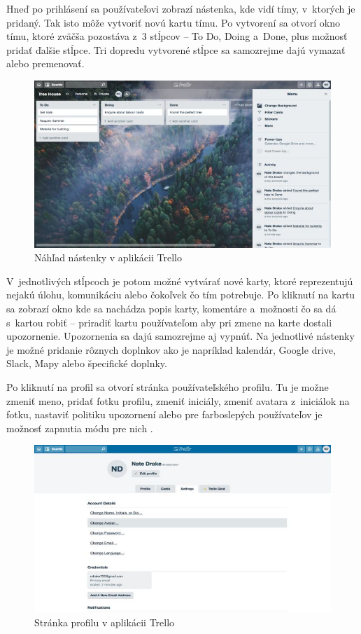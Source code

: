 \indent Hneď po prihlásení sa používateľovi zobrazí nástenka, kde vidí tímy, v ktorých je pridaný. Tak isto môže vytvoriť novú kartu tímu. Po vytvorení sa otvorí okno tímu, ktoré zväčša pozostáva z 3 stĺpcov – To Do, Doing a Done, plus možnosť pridať ďalšie stĺpce. Tri dopredu vytvorené stĺpce sa samozrejme dajú vymazať alebo premenovať. 

\begin{figure}[H]
    \centering
    \includegraphics[scale=0.65]{img/obr-trello.jpg}
    \caption{Náhľad nástenky v aplikácii Trello \cite{trello}}
    \label{fig:nastenka}
\end{figure}

\indent V jednotlivých stĺpcoch je potom možné vytvárať nové karty, ktoré reprezentujú nejakú úlohu, komunikáciu alebo čokoľvek čo tím potrebuje. Po kliknutí na kartu sa zobrazí okno kde sa nachádza popis karty, komentáre a možnosti čo sa dá s kartou robiť – priradiť kartu používateľom aby pri zmene na karte dostali upozornenie. Upozornenia sa dajú samozrejme aj vypnúť. Na jednotlivé nástenky je možné pridanie rôznych doplnkov ako je napríklad kalendár, Google drive, Slack, Mapy alebo špecifické doplnky. 

\indent Po kliknutí na profil sa otvorí stránka používateľského profilu. Tu je možne zmeniť meno, pridať fotku profilu, zmeniť iniciály, zmeniť avatara z iniciálok na fotku, nastaviť politiku upozornení alebo pre farboslepých používateľov je možnosť zapnutia módu pre nich \cite{trello_use}. 

\begin{figure}[H]
    \centering
    \includegraphics[scale=0.65]{img/obr-trello-profil.jpg}
    \caption{Stránka profilu v aplikácii Trello \cite{trello}}
    \label{fig:profil}
\end{figure}

